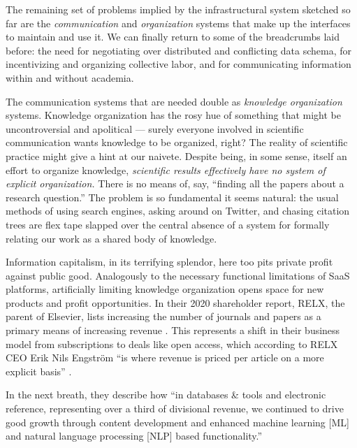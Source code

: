 The remaining set of problems implied by the infrastructural system
sketched so far are the \emph{communication} and \emph{organization}
systems that make up the interfaces to maintain and use it. We can
finally return to some of the breadcrumbs laid before: the need for
negotiating over distributed and conflicting data schema, for
incentivizing and organizing collective labor, and for communicating
information within and without academia.

The communication systems that are needed double as \emph{knowledge
organization} systems. Knowledge organization has the rosy hue of
something that might be uncontroversial and apolitical --- surely
everyone involved in scientific communication wants knowledge to be
organized, right? The reality of scientific practice might give a hint
at our naivete. Despite being, in some sense, itself an effort to
organize knowledge, \emph{scientific results effectively have no system
of explicit organization.} There is no means of, say, ``finding all the
papers about a research question.'' The problem is so fundamental
it seems natural: the usual methods of using search engines, asking
around on Twitter, and chasing citation trees are flex tape slapped over
the central absence of a system for formally relating our work as a
shared body of knowledge.

Information capitalism, in its terrifying splendor, here too pits
private profit against public good. Analogously to the necessary
functional limitations of SaaS platforms, artificially limiting
knowledge organization opens space for new products and profit
opportunities. In their 2020 shareholder report, RELX, the parent of
Elsevier, lists increasing the number of journals and papers as a
primary means of increasing revenue \citep{RELXAnnualReport2020} .
This represents a shift in their business model from subscriptions to
deals like open access, which according to RELX CEO Erik Nils Engström
``is where revenue is priced per article on a more explicit basis'' \citep{relx2020ResultsPresentation2021} .

In the next breath, they describe how ``in databases \& tools and
electronic reference, representing over a third of divisional revenue, we continued to drive good growth through
content development and enhanced machine learning {[}ML{]} and natural
language processing {[}NLP{]} based functionality.''

